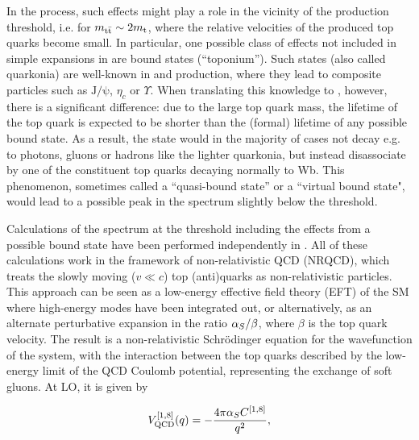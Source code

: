 In the \pptt process, such effects might play a role in the vicinity of the \ttbar production threshold, i.e. for $m_{\mathrm{t \bar{t}}} \sim 2 m_{\mathrm{t}}$, where the relative velocities of the produced top quarks become small. In particular, one possible class of effects not included in simple expansions in \alphas are \ttbar bound states (``toponium''). Such states (also called quarkonia) are well-known in \ccbar and \bbbar production, where they lead to composite particles such as $\mathrm{J/\psi}$, $\eta_c$ or $\Upsilon$. When translating this knowledge to \ttbar, however, there is a significant difference: due to the large top quark mass, the lifetime of the top quark is expected to be shorter than the (formal) lifetime of any possible \ttbar bound state. As a result, the state would in the majority of cases not decay e.g. to photons, gluons or hadrons like the lighter quarkonia, but instead disassociate by one of the constituent top quarks decaying normally to Wb. This phenomenon, sometimes called a ``quasi-bound state'' or a ``virtual bound state", would lead to a possible peak in the \mWWbb spectrum slightly below the \ttbar threshold.

Calculations of the \mWWbb spectrum at the \ttbar threshold including the effects from a possible bound state have been performed independently in . All of these calculations work in the framework of non-relativistic QCD (NRQCD), which treats the slowly moving ($v \ll c$) top (anti)quarks as non-relativistic particles. This approach can be seen as a low-energy effective field theory (EFT) of the SM where high-energy modes have been integrated out, or alternatively, as an alternate perturbative expansion in the ratio $\alpha_S/\beta$, where $\beta$ is the top quark velocity. The result is a non-relativistic Schr\"odinger equation for the wavefunction of the \ttbar system, with the interaction between the top quarks described by the low-energy limit of the QCD Coulomb potential, representing the exchange of soft gluons. At LO, it is given by~\cite{Kiyo:2008bv}

\begin{equation}
    V_{\mathrm{QCD}}^{[1,8]} (q) = - \frac{4 \pi \alpha_S C^{[1,8]}}{q^2} ,
\end{equation}

